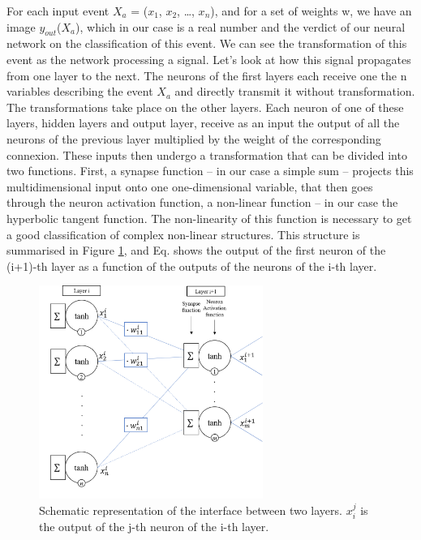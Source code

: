 For each input event $X_a$ = ($x_1$, $x_2$, …, $x_n$), and for a set of weights w, we have an image $y_{out}$($X_a$), which in our case is a real number and the verdict of our neural network on the classification of this event. We can see the transformation of this event as the network processing a signal. Let’s look at how this signal propagates from one layer to the next. The neurons of the first layers each receive one the n variables describing the event $X_a$ and directly transmit it without transformation. The transformations take place on the other layers. Each neuron of one of these layers, hidden layers and output layer, receive as an input the output of all the neurons of the previous layer multiplied by the weight of the corresponding connexion. These inputs then undergo a transformation that can be divided into two functions. First, a synapse function – in our case a simple sum – projects this multidimensional input onto one one-dimensional variable, that then goes through the neuron activation function, a non-linear function – in our case the hyperbolic tangent function. The non-linearity of this function is necessary to get a good classification of complex non-linear structures. This structure is summarised in Figure \ref{fig:ZERAZE}, and Eq.  shows the output of the first neuron of the (i+1)-th layer as a function of the outputs of the neurons of the i-th layer.

\begin{figure}[h!]
    \centering    \includegraphics[width=0.65\textwidth]{fig/NN_activation_et_synapse.png}
    \caption{
    Schematic representation of the interface between two layers. $x_i ^j$ is the output of the j-th neuron of the i-th layer.}
    \label{fig:ZERAZE}
\end{figure}

